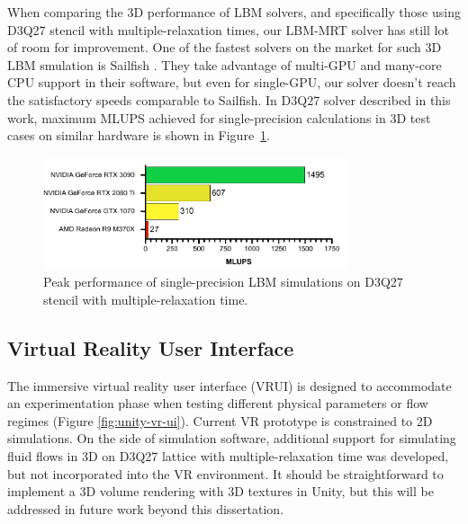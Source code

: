 When comparing the 3D performance of LBM solvers, and specifically those using D3Q27 stencil with multiple-relaxation times, our LBM-MRT solver has still lot of room for improvement. One of the fastest solvers on the market for such 3D LBM smulation is Sailfish \citep{januszewskiSailfishFlexibleMultiGPU2014}. They take advantage of multi-GPU and many-core CPU support in their software, but even for single-GPU, our solver doesn't reach the satisfactory speeds comparable to Sailfish. In D3Q27 solver described in this work, maximum MLUPS achieved for single-precision calculations in 3D test cases on similar hardware is shown in Figure~\ref{fig:max_mlups_3d}. 

\begin{figure}[!ht]
	\centering
	\includegraphics[width=0.8\textwidth]{data/max_mlups_3d.pdf}
	\caption{Peak performance of single-precision LBM simulations on D3Q27 stencil with multiple-relaxation time.}
	\label{fig:max_mlups_3d}
\end{figure}


\subsection{Virtual Reality User Interface}\label{sec:vrui}
The immersive virtual reality user interface (VRUI) is designed to accommodate an experimentation phase when testing different physical parameters or flow regimes (Figure \ref{fig:unity-vr-ui}). Current VR prototype is constrained to 2D simulations. On the side of simulation software, additional support for simulating fluid flows in 3D on D3Q27 lattice with multiple-relaxation time was developed, but not incorporated into the VR environment. It should be straightforward to implement a 3D volume rendering with 3D textures in Unity, but this will be addressed in future work beyond this dissertation.

